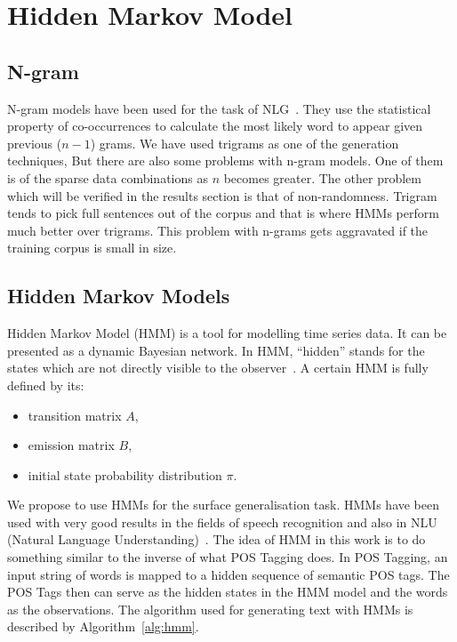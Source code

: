 \documentclass[a4paper,12pt]{article}
\begin{document}
\section{Hidden Markov Model}
\label{sec:method}

\subsection{N-gram}
N-gram models have been used for the task of NLG~\cite{nlgngram}. They
use the statistical property of co-occurrences to calculate the most likely word
to appear given previous ($n-1$) grams. We have used trigrams as one of the
generation techniques, But there are also some problems with n-gram models. One
of them is of the sparse data combinations as $n$ becomes greater. The other
problem which will be verified in the results section is that of non-randomness.
Trigram tends to pick full sentences out of the corpus and that is where HMMs
perform much better over trigrams. This problem with n-grams gets aggravated if
the training corpus is small in size. 


\subsection{Hidden Markov Models}
Hidden Markov Model (HMM) is a tool for modelling time series data.
It can be presented as a dynamic Bayesian network. In HMM, ``hidden''
stands for the states which are not directly visible to the observer~\cite{hmm}.
A certain HMM is fully defined by its:
\begin{itemize}
  \item transition matrix $A$,
  \item emission matrix $B$,
  \item initial state probability distribution $\pi$.
\end{itemize}

We propose to use HMMs for the surface generalisation task. HMMs have been used
with very good results in the fields of speech recognition and also in NLU
(Natural Language Understanding)~\cite{hmmsr}. The idea of HMM in this work is
to do something similar to the inverse of what POS Tagging does. In POS
Tagging, an input string of words is mapped to a hidden sequence of semantic POS
tags. The POS Tags then can serve as the hidden states in the HMM model and the
words as the observations. The algorithm used for generating text with HMMs is
described by Algorithm~\ref{alg:hmm}.
\end{document}
